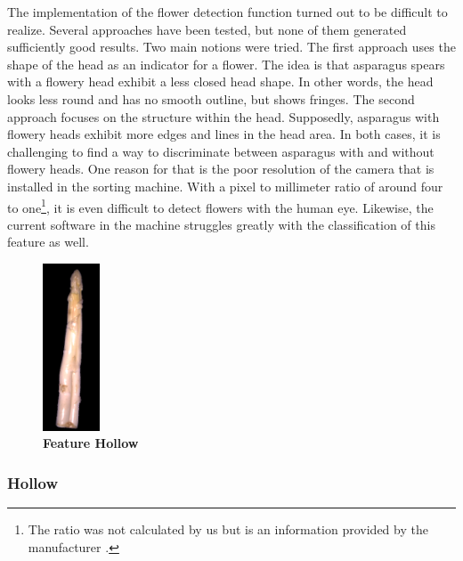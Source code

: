 \bigskip
The implementation of the flower detection function turned out to be difficult to realize. Several approaches have been tested, but none of them generated sufficiently good results. Two main notions were tried. The first approach uses the shape of the head as an indicator for a flower. The idea is that asparagus spears with a flowery head exhibit a less closed head shape. In other words, the head looks less round and has no smooth outline, but shows fringes. The second approach focuses on the structure within the head. Supposedly, asparagus with flowery heads exhibit more edges and lines in the head area. In both cases, it is challenging to find a way to discriminate between asparagus with and without flowery heads. One reason for that is the poor resolution of the camera that is installed in the sorting machine. With a pixel to millimeter ratio of around four to one\footnote{The ratio was not calculated by us but is an information provided by the manufacturer \citep{autoselectanleitung}.}, it is even difficult to detect flowers with the human eye. Likewise, the current software in the machine struggles greatly with the classification of this feature as well.

\begin{figure}
  \begin{center}
    \includegraphics[width=0.15\textwidth]{Figures/chapter03/example_img_hollow.png}
  \end{center}
  \vspace{-15pt}
  \caption[Example Image Feature Hollow]{ \textbf{Feature Hollow}}
  \label{fig:ExampleHollow}
  \vspace{15pt}
\end{figure}


\subsubsection{Hollow}
\label{subsec:Hollow}

